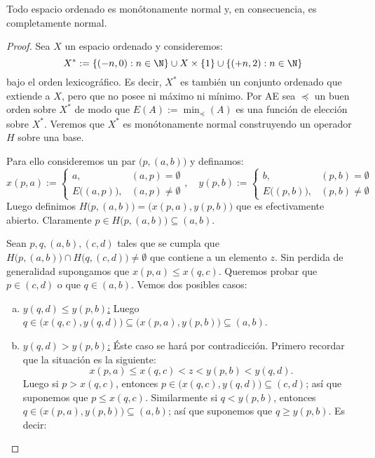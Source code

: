 \documentclass[topologia-analisis.tex]{subfiles}
\begin{document}
\begin{thm}
	Todo espacio ordenado es monótonamente normal y, en consecuencia, es completamente normal.
\end{thm}
\begin{proof}
	Sea $X$ un espacio ordenado y consideremos:
	$$ X^* := \{ (-n, 0) : n\in\N \} \cup X \times \{1\} \cup \{ (+n, 2) : n\in\N \} $$
	bajo el orden lexicográfico.
	Es decir, $X^*$ es también un conjunto ordenado que extiende a $X$, pero que no posee ni máximo ni mínimo.
	Por AE sea $\preceq$ un buen orden sobre $X^*$ de modo que $E( A ) := \min_\preceq(A)$ es una función de elección sobre $X^*$.
	Veremos que $X^*$ es monótonamente normal construyendo un operador $H$ sobre una base.

	Para ello consideremos un par $\big( p, (a, b) \big)$ y definamos:
	$$ x(p, a) :=
	\begin{cases}
		a,		   &(a, p) =   \emptyset \\
		E\big( (a, p) \big), &(a, p) \ne \emptyset
	\end{cases},
	\quad y(p, b) :=
	\begin{cases}
		b,		   &(p, b) =   \emptyset \\
		E\big( (p, b) \big), &(p, b) \ne \emptyset
	\end{cases} $$
	Luego definimos $H\big(p, (a, b)\big) = \big( x(p, a), y(p, b) \big)$ que es efectivamente abierto.
	Claramente $p \in H\big(p, (a, b)\big) \subseteq (a, b)$.

	Sean $p,q,(a,b),(c,d)$ tales que se cumpla que $H\big( p, (a, b) \big) \cap H\big( q, (c, d) \big) \ne \emptyset$ que contiene a un elemento $z$.
	Sin perdida de generalidad supongamos que $x(p, a) \le x(q, c)$.
	Queremos probar que $p \in (c, d)$ o que $q \in (a, b)$.
	Vemos dos posibles casos:
	\begin{enumerate}[a)]
		\item \underline{$y(q, d) \le y(p, b)$:}
			Luego $q \in \big( x(q, c), y(q, d) \big) \subseteq \big( x(p, a), y(p, b) \big) \subseteq (a, b)$.

		\item \underline{$y(q, d) > y(p, b)$:}
			Éste caso se hará por contradicción.
			Primero recordar que la situación es la siguiente:
			$$ x(p, a) \le x(q, c) < z < y(p, b) < y(q, d). $$
			Luego si $p > x(q, c)$, entonces $p \in \big( x(q, c), y(q, d) \big) \subseteq (c, d)$;
			así que suponemos que $p \le x(q, c)$.
			Similarmente si $q < y(p, b)$, entonces $q \in \big( x(p, a), y(p, b) \big) \subseteq (a, b)$;
			así que suponemos que $q \ge y(p, b)$. Es decir:


\end{enumerate}
\end{proof}
\end{document}
